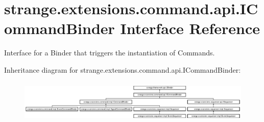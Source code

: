\hypertarget{interfacestrange_1_1extensions_1_1command_1_1api_1_1_i_command_binder}{\section{strange.\-extensions.\-command.\-api.\-I\-Command\-Binder Interface Reference}
\label{interfacestrange_1_1extensions_1_1command_1_1api_1_1_i_command_binder}
}


Interface for a Binder that triggers the instantiation of Commands.  


Inheritance diagram for strange.\-extensions.\-command.\-api.\-I\-Command\-Binder\-:\begin{figure}[H]
\begin{center}
\leavevmode
\includegraphics[height=2.064897cm]{interfacestrange_1_1extensions_1_1command_1_1api_1_1_i_command_binder}
\end{center}
\end{figure}
